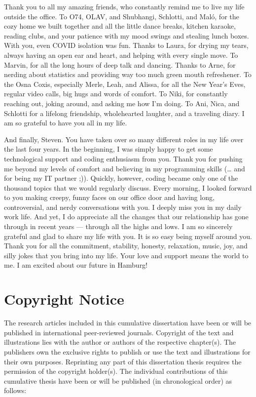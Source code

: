 \documentclass[
]{scrbook}
\begin{document}
Thank you to all my amazing friends, who constantly remind me to live my life outside the office. To O74, OLAV, and Shubhangi, Schlotti, and Maló, for the cozy home we built together and all the little dance breaks, kitchen karaoke, reading clubs, and your patience with my mood swings and stealing lunch boxes. With you, even COVID isolation was fun. Thanks to Laura, for drying my tears, always having an open ear and heart, and helping with every single move. To Marvin, for all the long hours of deep talk and dancing. Thanks to Arne, for nerding about statistics and providing way too much green mouth refreshener. To the Osna Coxis, especially Merle, Leah, and Alissa, for all the New Year's Eves, regular video calls, big hugs and words of comfort. To Niki, for constantly reaching out, joking around, and asking me how I'm doing. To Ani, Nica, and Schlotti for a lifelong friendship, wholehearted laughter, and a traveling diary. I am so grateful to have you all in my life.

And finally, Steven. You have taken over so many different roles in my life over the last four years. In the beginning, I was simply happy to get some technological support and coding enthusiasm from you. Thank you for pushing me beyond my levels of comfort and believing in my programming skills (\ldots{} and for being my IT partner ;)). Quickly, however, coding became only one of the thousand topics that we would regularly discuss. Every morning, I looked forward to you making creepy, funny faces on our office door and having long, controversial, and nerdy conversations with you. I deeply miss you in my daily work life. And yet, I do appreciate all the changes that our relationship has gone through in recent years --- through all the highs and lows. I am so sincerely grateful and glad to share my life with you. It is so easy being myself around you. Thank you for all the commitment, stability, honesty, relaxation, music, joy, and silly jokes that you bring into my life. Your love and support means the world to me. I am excited about our future in Hamburg!

\chapter{Copyright Notice}\label{copyright}

The research articles included in this cumulative dissertation have been or will be published in international peer-reviewed journals. Copyright of the text and illustrations lies with the author or authors of the respective chapter(s). The publishers own the exclusive rights to publish or use the text and illustrations for their own purposes. Reprinting any part of this dissertation thesis requires the permission of the copyright holder(s).
The individual contributions of this cumulative thesis have been or will be published (in chronological order) as follows:
\end{document}
